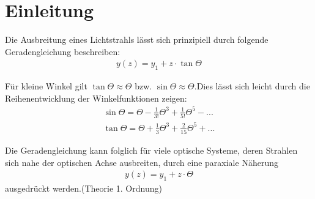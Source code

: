 \section{Einleitung}

Die Ausbreitung eines Lichtstrahls lässt sich prinzipiell durch folgende Geradengleichung beschreiben:
\begin{align*}
y(z)=y_1 + z \cdot \tan \Theta
\end{align*}

Für kleine Winkel gilt $\tan\Theta \approx \Theta$ bzw. $\sin \Theta \approx \Theta $.Dies lässt sich leicht durch die Reihenentwicklung der Winkelfunktionen zeigen:
\begin{align*}
\sin \Theta = \Theta - \frac{1}{3!}\Theta^3 + \frac{1}{5!}\Theta^5 - ... \\
\tan \Theta = \Theta + \frac{1}{3}\Theta^3 + \frac{2}{15}\Theta^5 + ...
\end{align*}

Die Geradengleichung kann folglich für viele optische Systeme, deren Strahlen sich nahe der optischen Achse ausbreiten, durch eine paraxiale Näherung 
\begin{align*}
y(z)=y_1 + z \cdot \Theta
\end{align*}
ausgedrückt werden.(Theorie 1. Ordnung) 

